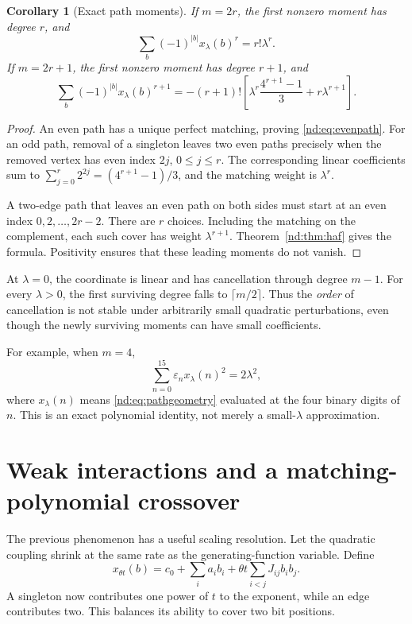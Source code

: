 \documentclass[11pt,a4paper,oneside,openany]{book}
\numberwithin{equation}{chapter}
\newtheorem{corollary}[theorem]{Corollary}
\theoremstyle{definition}
\theoremstyle{remark}
\newcommand{\eps}{\varepsilon}
\begin{document}
\begin{corollary}[Exact path moments]
\label{nd:cor:path}
If \(m=2r\), the first nonzero moment has degree \(r\), and
\begin{equation}
 \sum_b(-1)^{|b|}x_\lambda(b)^r=r!\lambda^r.
 \label{nd:eq:evenpath}
\end{equation}
If \(m=2r+1\), the first nonzero moment has degree \(r+1\), and
\begin{equation}
 \sum_b(-1)^{|b|}x_\lambda(b)^{r+1}
 =-(r+1)!\left[
     \lambda^r\frac{4^{r+1}-1}{3}+r\lambda^{r+1}\right].
 \label{nd:eq:oddpath}
\end{equation}
\end{corollary}
\begin{proof}
An even path has a unique perfect matching, proving
\eqref{nd:eq:evenpath}. For an odd path, removal of a singleton leaves two
even paths precisely when the removed vertex has even index \(2j\),
\(0\le j\le r\). The corresponding linear coefficients sum to
\(\sum_{j=0}^r2^{2j}=(4^{r+1}-1)/3\), and the matching weight is
\(\lambda^r\).

A two-edge path that leaves an even path on both sides must start at an even
index \(0,2,\ldots,2r-2\). There are \(r\) choices. Including the matching
on the complement, each such cover has weight \(\lambda^{r+1}\).
Theorem~\ref{nd:thm:haf} gives the formula. Positivity ensures that these leading
moments do not vanish.
\end{proof}

At \(\lambda=0\), the coordinate is linear and has cancellation through degree
\(m-1\). For every \(\lambda>0\), the first surviving degree falls to
\(\lceil m/2\rceil\). Thus the \emph{order} of cancellation is not stable under
arbitrarily small quadratic perturbations, even though the newly surviving
moments can have small coefficients.

For example, when \(m=4\),
\[
 \sum_{n=0}^{15}\eps_n x_\lambda(n)^2=2\lambda^2,
\]
where \(x_\lambda(n)\) means \eqref{nd:eq:pathgeometry} evaluated at the four
binary digits of \(n\). This is an exact polynomial identity, not merely a
small-\(\lambda\) approximation.
\chapter{Weak interactions and a matching-polynomial crossover}
\label{nd:sec:crossover}

The previous phenomenon has a useful scaling resolution. Let the quadratic
coupling shrink at the same rate as the generating-function variable. Define
\begin{equation}
 x_{\theta t}(b)=c_0+\sum_i a_i b_i
                  +\theta t\sum_{i<j}J_{ij}b_ib_j.
 \label{nd:eq:scaledgeometry}
\end{equation}
A singleton now contributes one power of \(t\) to the exponent, while an edge
contributes two. This balances its ability to cover two bit positions.
\end{document}
